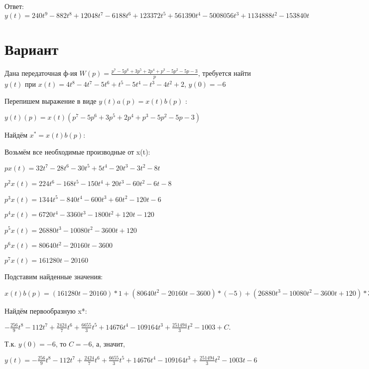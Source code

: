 \documentclass{article}
\begin{document}
{{{{{Ответ: $y(t) = 240t^{9}-882t^{8}+12048t^{7}-6188t^{6}+123372t^{5}+561390t^{4}-5008056t^{3}+1134888t^{2}-153840t$

\section{Вариант}

Дана передаточная ф-ия $W(p)=\frac{p^{7}-5p^{6}+3p^{5}+2p^{4}+p^{3}-5p^{2}-5p-3}{p}$, требуется найти $y(t)$ при $x(t)=4t^{8}-4t^{7}-5t^{6}+t^{5}-5t^{4}-t^{3}-4t^{2}+2$, $y(0)=-6$

Перепишем выражение в виде $y(t)a(p)=x(t)b(p)$ :

$y(t)(p)=x(t)(p^{7}-5p^{6}+3p^{5}+2p^{4}+p^{3}-5p^{2}-5p-3)$

Найдём $x^*=x(t)b(p)$:

Возьмём все необходимые производные от x(t):

$px(t)=32t^{7}-28t^{6}-30t^{5}+5t^{4}-20t^{3}-3t^{2}-8t$

$p^2x(t)=224t^{6}-168t^{5}-150t^{4}+20t^{3}-60t^{2}-6t-8$

$p^3x(t)=1344t^{5}-840t^{4}-600t^{3}+60t^{2}-120t-6$

$p^4x(t)=6720t^{4}-3360t^{3}-1800t^{2}+120t-120$

$p^5x(t)=26880t^{3}-10080t^{2}-3600t+120$

$p^6x(t)=80640t^{2}-20160t-3600$

$p^7x(t)=161280t-20160$

Подставим найденные значения:

$x(t)b(p) = (161280t-20160)*1+(80640t^{2}-20160t-3600)*(-5)+(26880t^{3}-10080t^{2}-3600t+120)*3+(6720t^{4}-3360t^{3}-1800t^{2}+120t-120)*2+(1344t^{5}-840t^{4}-600t^{3}+60t^{2}-120t-6)*1+(224t^{6}-168t^{5}-150t^{4}+20t^{3}-60t^{2}-6t-8)*(-5)+(32t^{7}-28t^{6}-30t^{5}+5t^{4}-20t^{3}-3t^{2}-8t)*(-5)+(32t^{7}-28t^{6}-30t^{5}+5t^{4}-20t^{3}-3t^{2}-8t)*(-3)=-256t^{7}-896t^{6}+2424t^{5}+13310t^{4}+73380t^{3}-436656t^{2}+251494t$





Найдём первообразную x*:

$-\frac{256}{9}t^{8}-112t^{7}+\frac{2424}{7}t^{6}+\frac{6655}{3}t^{5}+14676t^{4}-109164t^{3}+\frac{251494}{3}t^{2}-1003+C.$

Т.к. $y(0)=-6$, то $C=-6$, а, значит, 

$y(t)=-\frac{256}{9}t^{8}-112t^{7}+\frac{2424}{7}t^{6}+\frac{6655}{3}t^{5}+14676t^{4}-109164t^{3}+\frac{251494}{3}t^{2}-1003t-6$

}}}}}
\end{document}
